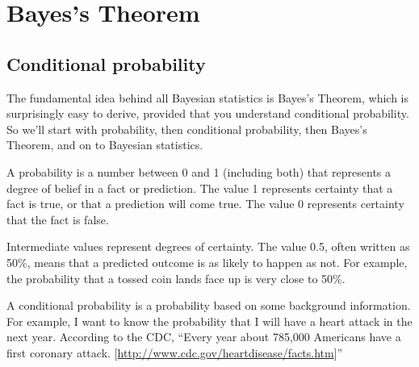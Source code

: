 \documentclass[12pt]{book}
\begin{document}
\normalsize

\clearemptydoublepage

\begin{latexonly}

\tableofcontents

\clearemptydoublepage

\end{latexonly}

\mainmatter

\newcommand{\p}[1]{\ensuremath{\mathrm{p}(#1)}}
\newcommand{\odds}[1]{\ensuremath{\mathrm{o}(#1)}}
\newcommand{\T}[1]{\mbox{#1}}
\newcommand{\AND}{~\mathrm{and}~}
\newcommand{\NOT}{\mathrm{not}~}


\chapter{Bayes's Theorem}
\label{intro}

\section{Conditional probability}

The fundamental idea behind all Bayesian statistics is Bayes's Theorem,
which is surprisingly easy to derive, provided that you understand
conditional probability.  So we'll start with probability, then
conditional probability, then Bayes's Theorem, and on to Bayesian
statistics.

A probability is a number between 0 and 1 (including both) that
represents a degree of belief in a fact or prediction.  The value
1 represents certainty that a fact is true, or that a prediction
will come true.  The value 0 represents certainty
that the fact is false.

Intermediate values represent degrees of certainty.  The value 0.5,
often written as 50\%, means that a predicted outcome is
as likely to happen as not.  For example, the probability that a tossed
coin lands face up is very close to 50\%.

A conditional probability is a probability based on some background
information.  For example, I want to know the probability
that I will have a heart attack in the next year.  According to the
CDC, ``Every year about 785,000 Americans have a first coronary attack.
[\url{http://www.cdc.gov/heartdisease/facts.htm}]''
\end{document}
